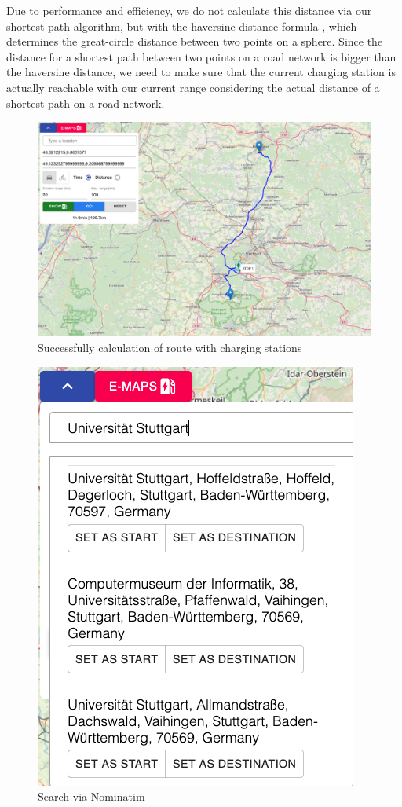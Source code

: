 \documentclass[a4paper]{article}
\begin{document}
Due to performance and efficiency, we do not calculate this distance via our shortest path algorithm, but with the haversine distance formula \cite{10.2307/2309088}, which determines the great-circle distance between two points on a sphere.
Since the distance for a shortest path between two points on a road network is bigger than the haversine distance, we need to make sure that the current charging station is actually reachable with our current range considering the actual distance of a shortest path on a road network.
\begin{figure}[h]
	\centering
	\includegraphics[scale=0.27]{figures/success}
	\caption{Successfully calculation of route with charging stations}
	\label{fig:success}
\end{figure}
\begin{figure}[h]
	\centering
	\includegraphics[scale=0.4]{figures/search}
	\caption{Search via Nominatim}
	\label{fig:search}
\end{figure}
\end{document}
